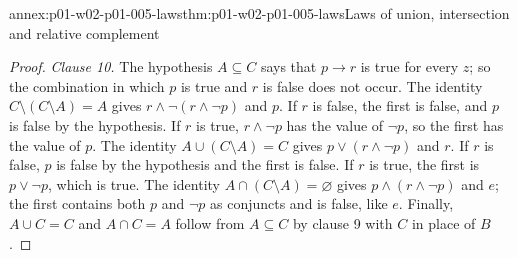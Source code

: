 \begin{annexitem}{annex:p01-w02-p01-005-laws}{thm:p01-w02-p01-005-laws}{Laws of union, intersection and relative complement}
\begin{proof}
\emph{Clause 10.} The hypothesis \(A\subseteq C\) says that \(p\to r\) is true
for every \(z\); so the combination in which \(p\) is true and \(r\) is false
does not occur. The identity \(C\setminus(C\setminus A)=A\) gives
\(r\land\neg(r\land\neg p)\) and \(p\). If \(r\) is false, the first is false,
and \(p\) is false by the hypothesis. If \(r\) is true, \(r\land\neg p\) has the
value of \(\neg p\), so the first has the value of \(p\). The identity
\(A\cup(C\setminus A)=C\) gives \(p\lor(r\land\neg p)\) and \(r\). If \(r\) is
false, \(p\) is false by the hypothesis and the first is false. If \(r\) is
true, the first is \(p\lor\neg p\), which is true. The identity
\(A\cap(C\setminus A)=\varnothing\) gives \(p\land(r\land\neg p)\) and \(e\);
the first contains both \(p\) and \(\neg p\) as conjuncts and is false, like
\(e\). Finally, \(A\cup C=C\) and \(A\cap C=A\) follow from
\(A\subseteq C\) by clause 9 with \(C\) in place of \(B\).
\end{proof}
\end{annexitem}

